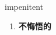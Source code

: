 
\begin{frame}
{\huge impenitent}
\begin{center}
\begin{enumerate}\Large
  \item \textbf{不悔悟的}
\end{enumerate}
\end{center}
\end{frame}
